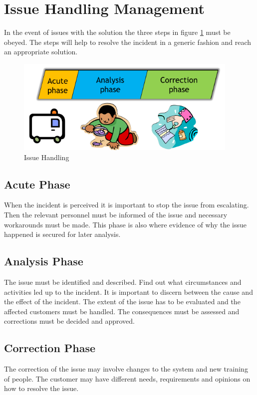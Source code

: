 \section{Issue Handling Management}
In the event of issues with the solution the three steps in figure \ref{fig:issue_handling} must be obeyed. The steps will help to resolve the incident in a generic fashion and reach an appropriate solution.

\begin{center}
\begin{figure}[H]
\centering
\includegraphics[width=0.95\textwidth]
{Billeder/IssueHandling.PNG}
\caption{Issue Handling}
\label{fig:issue_handling}
\end{figure}
\end{center}

\subsection{Acute Phase}
When the incident is perceived it is important to stop the issue from escalating. Then the relevant personnel must be informed of the issue and necessary workarounds must be made.
This phase is also where evidence of why the issue happened is secured for later analysis.

\subsection{Analysis Phase}
The issue must be identified and described. Find out what circumstances and activities led up to the incident. It is important to discern between the cause and the effect of the incident. The extent of the issue has to be evaluated and the affected customers must be handled. The consequences must be assessed and corrections must be decided and approved.

\subsection{Correction Phase}
The correction of the issue may involve changes to the system and new training of people. The customer may have different needs, requirements and opinions on how to resolve the issue.

